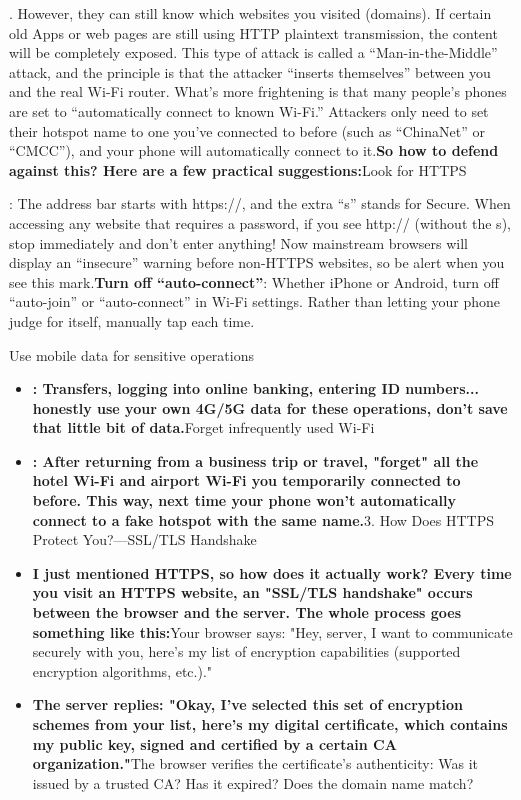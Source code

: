. However, they can still know which websites you visited (domains). If certain old Apps or web pages are still using HTTP plaintext transmission, the content will be completely exposed. This type of attack is called a “Man-in-the-Middle” attack, and the principle is that the attacker “inserts themselves” between you and the real Wi-Fi router. What's more frightening is that many people's phones are set to “automatically connect to known Wi-Fi.” Attackers only need to set their hotspot name to one you've connected to before (such as “ChinaNet” or “CMCC”), and your phone will automatically connect to it.\textbf{So how to defend against this? Here are a few practical suggestions:}Look for HTTPS

: The address bar starts with https://, and the extra “s” stands for Secure. When accessing any website that requires a password, if you see http:// (without the s), stop immediately and don't enter anything! Now mainstream browsers will display an “insecure” warning before non-HTTPS websites, so be alert when you see this mark.\textbf{Turn off “auto-connect”}: Whether iPhone or Android, turn off “auto-join” or “auto-connect” in Wi-Fi settings. Rather than letting your phone judge for itself, manually tap each time.

Use mobile data for sensitive operations

\begin{itemize}
  \item \textbf{: Transfers, logging into online banking, entering ID numbers... honestly use your own 4G/5G data for these operations, don't save that little bit of data.}Forget infrequently used Wi-Fi
  \item \textbf{: After returning from a business trip or travel, "forget" all the hotel Wi-Fi and airport Wi-Fi you temporarily connected to before. This way, next time your phone won't automatically connect to a fake hotspot with the same name.}3. How Does HTTPS Protect You?—SSL/TLS Handshake
  \item \textbf{I just mentioned HTTPS, so how does it actually work? Every time you visit an HTTPS website, an "SSL/TLS handshake" occurs between the browser and the server. The whole process goes something like this:}Your browser says: "Hey, server, I want to communicate securely with you, here's my list of encryption capabilities (supported encryption algorithms, etc.)."
  \item \textbf{The server replies: "Okay, I've selected this set of encryption schemes from your list, here's my digital certificate, which contains my public key, signed and certified by a certain CA organization."}The browser verifies the certificate's authenticity: Was it issued by a trusted CA? Has it expired? Does the domain name match?
\end{itemize}

